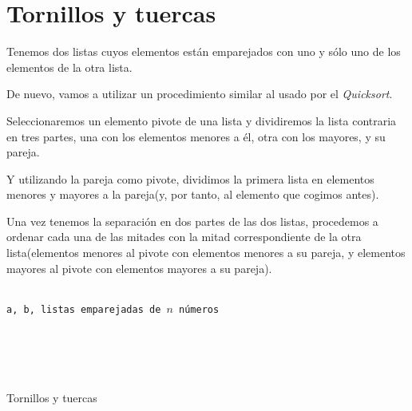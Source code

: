 \documentclass[a4paper, 11pt]{article} %
\begin{document}
\section {Tornillos y tuercas}
    Tenemos dos listas cuyos elementos están emparejados con uno y sólo uno de los elementos de la otra lista.
    
    De nuevo, vamos a utilizar un procedimiento similar al usado por el \textit{Quicksort}.
    
    Seleccionaremos un elemento pivote de una lista y dividiremos la lista contraria en tres partes, una con los elementos menores a él, otra con los mayores, y su pareja.
    
    Y utilizando la pareja como pivote, dividimos la primera lista en elementos menores y mayores a la pareja(y, por tanto, al elemento que cogimos antes).
    
    Una vez tenemos la separación en dos partes de las dos listas, procedemos a ordenar cada una de las mitades con la mitad correspondiente de la otra lista(elementos menores al pivote con elementos menores a su pareja, y elementos mayores al pivote con elementos mayores a su pareja).
\begin{algorithm}[H]
	\begin{algorithmic}[1]
	  \REQUIRE \ \\
	    \texttt{a, b, listas emparejadas de $n$ números}\\
	    \RETURN {\texttt{[]}}
	  \ELSE
	  \ENDIF \\
	  \ENDIF \\
	  
	  \ENDIF \\\
	\end{algorithmic}
    \caption{Tornillos y tuercas}
    \label{TyT}
\end{algorithm}
\end{document}
